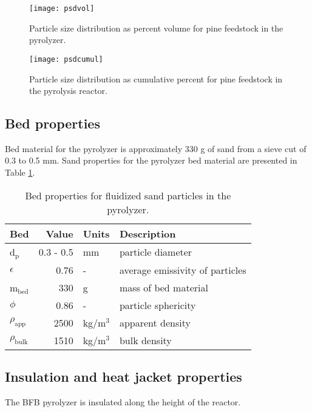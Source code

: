 \begin{figure}[H]
    \centering
    \texttt{[image: psdvol]}
    \caption{Particle size distribution as percent volume for pine feedstock in the pyrolyzer.}
    \label{fig:psdvol}
\end{figure}

\begin{figure}[H]
    \centering
    \texttt{[image: psdcumul]}
    \caption{Particle size distribution as cumulative percent for pine feedstock in the pyrolysis reactor.}
    \label{fig:psdcumul}
\end{figure}

\subsection{Bed properties}

Bed material for the pyrolyzer is approximately 330 g of sand from a sieve cut of 0.3 to 0.5 mm. Sand properties for the pyrolyzer bed material are presented in Table \ref{tab:sand-properties}.

\begin{table}[H]
    \centering
    \caption{Bed properties for fluidized sand particles in the pyrolyzer.}
    \label{tab:sand-properties}
    \begin{tabular}{lrll}
        \toprule
        Bed & Value & Units & Description \\
        \midrule
        d$_\textrm{p}$ & 0.3 - 0.5 & mm & particle diameter \\
        $\epsilon$ & 0.76 & - & average emissivity of particles \\
        m$_\textrm{bed}$ & 330 & g & mass of bed material \\
        $\phi$ & 0.86 & - & particle sphericity \\
        $\rho_\textrm{app}$ & 2500 & kg/m$^3$ & apparent density \\
        $\rho_\textrm{bulk}$ & 1510 & kg/m$^3$ & bulk density \\
        \bottomrule
    \end{tabular}
\end{table}

\subsection{Insulation and heat jacket properties}

The BFB pyrolyzer is insulated along the height of the reactor.

